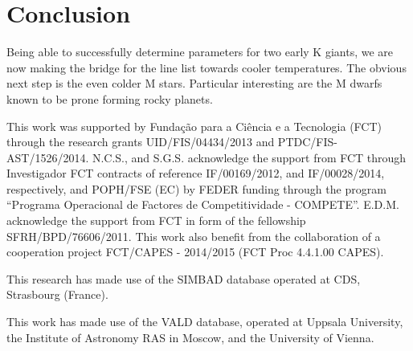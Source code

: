 \documentclass{aa}
\begin{document}
\section{Conclusion}
\label{sec:conclusion}

Being able to successfully determine parameters for two early K giants, we are
now making the bridge for the line list towards cooler temperatures. The obvious
next step is the even colder M stars. Particular interesting are the M dwarfs
known to be prone forming rocky planets.





\begin{acknowledgements}

This work was supported by Funda\c{c}\~ao para a Ci\^encia e a Tecnologia (FCT)
through the research grants UID/FIS/04434/2013 and PTDC/FIS-AST/1526/2014.
N.C.S., and S.G.S. acknowledge the support from FCT through Investigador FCT
contracts of reference IF/00169/2012, and IF/00028/2014, respectively, and
POPH/FSE (EC) by FEDER funding through the program “Programa Operacional de
Factores de Competitividade - COMPETE”. E.D.M. acknowledge the support from FCT
in form of the fellowship SFRH/BPD/76606/2011. This work also benefit from the
collaboration of a cooperation project FCT/CAPES - 2014/2015 (FCT Proc 4.4.1.00
CAPES).

This research has made use of the SIMBAD database operated at CDS, Strasbourg
(France).

This work has made use of the VALD database, operated at Uppsala University, the
Institute of Astronomy RAS in Moscow, and the University of Vienna.

\end{acknowledgements}




\end{document}

